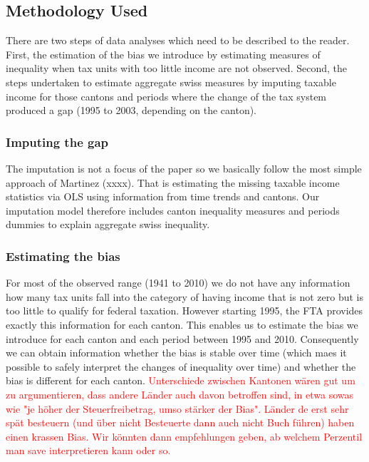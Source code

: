\documentclass[twoside]{article}\usepackage[]{graphicx}\usepackage[]{color}
\begin{document}
\begin{multicols}{2}
\subsection{Methodology Used}
There are two steps of data analyses which need to be described to the reader. First, the estimation of the bias we introduce by estimating measures of inequality when tax units with too little income are not observed. Second, the steps undertaken to estimate aggregate swiss measures by imputing taxable income for those cantons and periods where the change of the tax system produced a gap (1995 to 2003, depending on the canton). 

\subsubsection{Imputing the gap}
The imputation is not a focus of the paper so we basically follow the most simple approach of Martinez (xxxx). That is estimating the missing taxable income statistics via OLS using information from time trends and cantons. Our imputation model therefore includes canton inequality measures and periods dummies to explain aggregate swiss inequality.

\subsubsection{Estimating the bias}
For most of the observed range (1941 to 2010) we do not have any information how many tax units fall into the category of having income that is not zero but is too little to qualify for federal taxation. However starting 1995, the FTA provides exactly this information for each canton. This enables us to estimate the bias we introduce for each canton and each period between 1995 and 2010. Consequently we can obtain information whether the bias is stable over time (which maes it possible to safely interpret the changes of inequality over time) and whether the bias is different for each canton. \textcolor{red}{Unterschiede zwischen Kantonen wären gut um zu argumentieren, dass andere Länder auch davon betroffen sind, in etwa sowas wie "je höher der Steuerfreibetrag, umso stärker der Bias". Länder de erst sehr spät besteuern (und über nicht Besteuerte dann auch nicht Buch führen) haben einen krassen Bias. Wir könnten dann empfehlungen geben, ab welchem Perzentil man save interpretieren kann oder so.}






\end{multicols}
\end{document}
